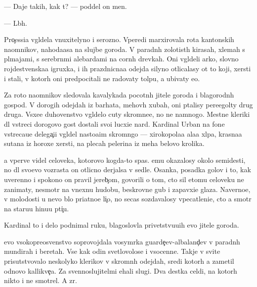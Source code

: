 \documentclass[10pt]{book}
\begin{document}
— Daje takih, kak t{\yi}? — poddel on men{\ia}.

— L{\io}b{\yi}h.

Pro{\c}essi{\y}a v{\yi}gl{\ia}dela vnuxitelyno i ser{\y}ozno. Vperedi marxirovala rota kantonskih na{\y}om\-ni\-kov, nahod{\ia}{\x}a{\y}asa na slujbe go\-ro\-da. V paradn{\yi}h zolotist{\yi}h kirasah, xlemah s pl{\io}majami, s serebr{\ia}n{\yi}mi alebardami na corn{\yi}h drevkah. Oni v{\yi}gl{\ia}deli {\y}arko, slovno rojdestvenska{\y}a igruxka, i ih prazdnicna{\y}a odejda silyno otlicalasy ot to{\y} koji, xersti i stali, v kotor{\yi}h oni predpocitali ne radovaty tolpu, a ubivaty {\y}e{\y}o.

Za roto{\y} na{\y}om\-ni\-kov sledovala kavalykada pocotn{\yi}h jitele{\y} go\-ro\-da i blago\-rod\-n{\yi}h gospod. V dorogih odejdah iz barhata, mehov{\yi}h xubah, oni p{\yi}talisy pere\-{\x}e\-go\-l{\ia}ty drug druga. V{\yi}sxe{\y}e duhovenstvo v{\yi}gl{\ia}delo cuty skromne{\y}e, no ne namnogo. Mestn{\yi}{\y}e kleriki dl{\ia} vstreci dorogovo gost{\ia} dostali svo{\y}i lucxi{\y}e nar{\ia}d{\yi}. Kardinal Urban na fone vstreca{\y}u{\x}e{\y} delega{\c}i{\y}i v{\yi}gl{\ia}del nasto{\y}a{\x}im skromn{\ia}go{\y} — xirokopola{\y}a ala{\y}a xl{\ia}pa, krasna{\y}a sutana iz horoxe{\y} xersti, na plecah pelerina iz meha belovo krolika.

{\Y}a vperv{\yi}{\y}e videl celoveka, kotorovo kogda-to spas. {\Y}emu okazalosy okolo semi\-des{\ia}\-ti, no dl{\ia} svo{\y}evo vozrasta on otlicno derjalsa v sedle. Osanka, posadka golov{\yi} i to, kak uverenno i spo\-ko{\y}\-no on pravil jereb{\c}om, govorili o tom, cto sil etomu celoveku ne zanimaty, ne\-smo\-tr{\ia} na vnexn{\io}{\y}u hudobu, beskrovn{\yi}{\y}e gub{\yi} i zapavxi{\y}e glaza. Naverno{\y}e, v molodosti u nevo b{\yi}lo pri{\y}atno{\y}e li{\c}o, no se{\y}cas sozdavalosy vpe\-catle\-ni\-{\y}e, cto {\y}a smotr{\io} na staru{\y}u hi{\x}nu{\y}u pti{\c}u.

Kardinal to i delo podnimal ruku, blagoslovl{\ia}{\y}a privetstvu{\y}u{\x}ih {\y}evo jitele{\y} go\-ro\-da.

{\Y}evo v{\yi}sokopreosv{\ia}{\x}enstvo soprovojdala vosym{\e}rka guarde{\y}{\c}ev-albaland{\c}ev v paradn{\yi}h mundirah i beretah. Vse kak odin svetlovolos{\yi}{\y}e i v{\yi}socenn{\yi}{\y}e. Takje v svite prisutstvovalo neskolyko klerikov v skromn{\yi}h odejdah, sredi kotor{\yi}h {\y}a zametil odnovo kallikve{\c}a. Za sv{\ia}{\x}ennoslujitel{\ia}mi {\y}ehali slugi. Dva des{\ia}tka cel{\ia}di, na kotor{\yi}h nikto i ne smotrel. A zr{\ia}.
\end{document}
